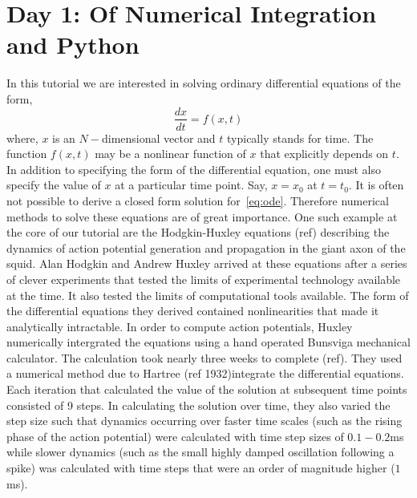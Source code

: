 \documentclass[10pt,letterpaper]{article}
\begin{document}


\section*{Day 1: Of Numerical Integration and Python}
In this tutorial we are interested in solving ordinary differential equations of the form,
\begin{equation}
\frac{dx}{dt} = f(x, t)
\label{eq:ode}
\end{equation}
where, $x$ is an $N-$dimensional vector and $t$ typically stands for time. The function $f(x,t)$ may be a nonlinear function of $x$ that explicitly depends on $t$. In addition to specifying the form of the differential equation, one must also specify the value of $x$ at a particular time point. Say, $x=x_{0}$ at $t = t_0$. It is often not possible to derive a closed form solution for~\ref{eq:ode}. Therefore numerical methods to solve these equations are of great importance. One such example at the core of our tutorial are the Hodgkin-Huxley equations (ref) describing the dynamics of action potential generation and propagation in the giant axon of the squid. Alan Hodgkin and Andrew Huxley arrived at these equations after a series of clever experiments that tested the limits of experimental technology available at the time. It also tested the limits of computational tools available. The form of the differential equations they derived contained nonlinearities that made it analytically intractable. In order to compute action potentials, Huxley numerically intergrated the equations using a hand operated Bunsviga mechanical calculator. The calculation took nearly three weeks to complete (ref). They used a numerical method due to Hartree (ref 1932)integrate the differential equations. Each iteration that calculated the value of the solution at subsequent time points consisted of 9 steps. In calculating the solution over time, they also varied the step size such that dynamics occurring over faster time scales (such as the rising phase of the action potential) were calculated with time step sizes of $0.1-0.2$ms while slower dynamics (such as the small highly damped oscillation following a spike) was calculated with time steps that were an order of magnitude higher ($1$ms).
\end{document}
